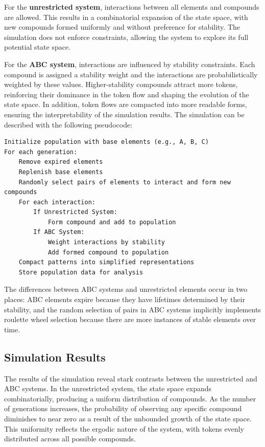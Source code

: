 \documentclass[entropy,article,submit,pdftex,oneauthor]{Definitions/mdpi}
\begin{document}
For the \textbf{unrestricted system}, interactions between all elements and compounds are allowed. This results in a combinatorial expansion of the state space, with new compounds formed uniformly and without preference for stability. The simulation does not enforce constraints, allowing the system to explore its full potential state space.

For the \textbf{ABC system}, interactions are influenced by stability constraints. Each compound is assigned a stability weight and the interactions are probabilistically weighted by these values. Higher-stability compounds attract more tokens, reinforcing their dominance in the token flow and shaping the evolution of the state space. In addition, token flows are compacted into more readable forms, ensuring the interpretability of the simulation results. The simulation can be described with the following pseudocode:

\scriptsize
\begin{center}
\begin{minipage}{0.7\textwidth}
\ttfamily
\begin{verbatim}
Initialize population with base elements (e.g., A, B, C)
For each generation:
    Remove expired elements
    Replenish base elements
    Randomly select pairs of elements to interact and form new compounds
    For each interaction:
        If Unrestricted System:
            Form compound and add to population
        If ABC System:
            Weight interactions by stability
            Add formed compound to population
    Compact patterns into simplified representations
    Store population data for analysis
\end{verbatim}
\end{minipage}
\end{center}
\normalsize

The differences between ABC systems and unrestricted elements occur in two places: ABC elements expire because they have lifetimes determined by their stability, and the random selection of pairs in ABC systems implicitly implements roulette wheel selection \cite{goldberg1989genetic} \cite{holland1975adaptation} because there are more instances of stable elements over time. 

\subsection{Simulation Results}

The results of the simulation reveal stark contrasts between the unrestricted and ABC systems. In the unrestricted system, the state space expands combinatorially, producing a uniform distribution of compounds. As the number of generations increases, the probability of observing any specific compound diminishes to near zero as a result of the unbounded growth of the state space. This uniformity reflects the ergodic nature of the system, with tokens evenly distributed across all possible compounds.
\end{document}
